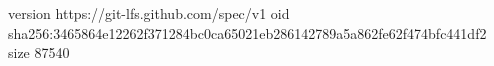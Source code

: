 version https://git-lfs.github.com/spec/v1
oid sha256:3465864e12262f371284bc0ca65021eb286142789a5a862fe62f474bfc441df2
size 87540
